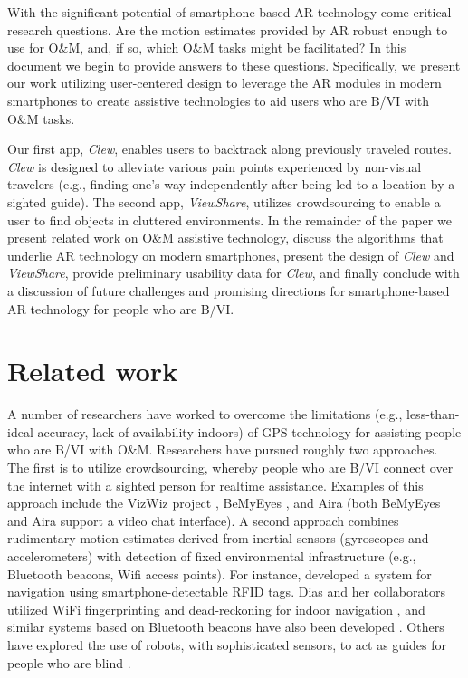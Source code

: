 \documentclass[chi_draft]{sigchi}
\newcommand{\BVI}{B/VI\xspace}
\newcommand{\OM}{O\&M\xspace}
\begin{document}
With the significant potential of smartphone-based AR technology come critical research questions.  Are the motion estimates provided by AR robust enough to use for \OM, and, if so, which \OM tasks might be facilitated?  In this document we begin to provide answers to these questions.  Specifically, we present our work utilizing user-centered design to leverage the AR modules in modern smartphones to create assistive technologies to aid users who are \BVI with \OM tasks.%

Our first app, \emph{Clew}, enables users to backtrack along previously traveled routes.  \emph{Clew} is designed to alleviate various pain points experienced by non-visual travelers (e.g., finding one's way independently after being led to a location by a sighted guide).  The second app, \emph{ViewShare}, utilizes crowdsourcing to enable a user to find objects in cluttered environments.  In the remainder of the paper we present related work on \OM assistive technology, discuss the algorithms that underlie AR technology on modern smartphones, present the design of \emph{Clew} and \emph{ViewShare}, provide preliminary usability data for \emph{Clew}, and finally conclude with a discussion of future challenges and promising directions for smartphone-based AR technology for people who are \BVI.

\section{Related work}

A number of researchers have worked to overcome the limitations (e.g., less-than-ideal accuracy, lack of availability indoors) of GPS technology for assisting people who are \BVI with \OM.  Researchers have pursued roughly two approaches.  The first is to utilize crowdsourcing, whereby people who are \BVI connect over the internet with a sighted person for realtime assistance.  Examples of this approach include the VizWiz project \cite{bigham2010vizwiz}, BeMyEyes \cite{bemyeyesaccessworld}, and Aira \cite{aira} (both BeMyEyes and Aira support a video chat interface).  A second approach combines rudimentary motion estimates derived from inertial sensors (gyroscopes and accelerometers) with detection of fixed environmental infrastructure (e.g., Bluetooth beacons, Wifi access points).  For instance, \cite{ganz2015percept, ganz2011percept, ganz2014percept} developed a system for navigation using smartphone-detectable RFID tags.  Dias and her collaborators utilized WiFi fingerprinting and dead-reckoning for indoor navigation \cite{Dias__2014_7778}, and similar systems based on Bluetooth beacons have also been developed \cite{ishihara2017beacon, ahmetovic2016navcog}.  Others have explored the use of robots, with sophisticated sensors, to act as guides for people who are blind \cite{Nanavati:2018:CIN:3173386.3176976}.
\end{document}
